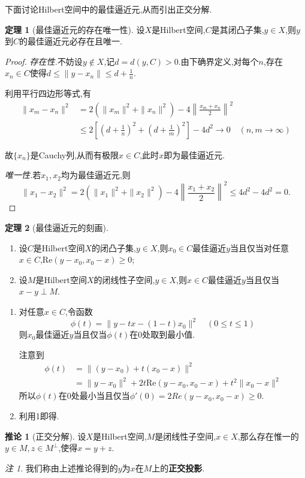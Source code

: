 \documentclass{ctexart}
\theoremstyle{definition}
\newtheorem{theorem}{定理}
\newtheorem{corollary}{推论}
\theoremstyle{remark}
\newtheorem*{remark}{注}
\newenvironment{proofsketch}{
  \renewcommand{\proofname}{证明概要}\proof}{\endproof}
\begin{document}
	下面讨论Hilbert空间中的最佳逼近元,从而引出正交分解.
	\begin{theorem}[最佳逼近元的存在唯一性]
		设$X$是Hilbert空间,$C$是其闭凸子集,$y\in X$,则$y$到$C$的最佳逼近元必存在且唯一.
	\end{theorem}
	\begin{proof}
		\textit{存在性.}不妨设$y\notin X$,记$d=d(y,C)>0$.由下确界定义,对每个$n$,存在$x_n\in C$使得$d\le\|y-x_n\|\le d+\frac{1}{n}$.
		
		利用平行四边形等式,有
		\begin{align*}
			\|x_m-x_n\|^2 & = 2(\|x_m\|^2+\|x_n\|^2)-4\left\|\frac{x_m+x_n}{2}\right\|^2 \\
			& \le 2\left[\left(d+\frac{1}{n}\right)^2+\left(d+\frac{1}{m}\right)^2\right]-4d^2\to 0\quad(n,m\to\infty)
		\end{align*}
		
		故$\{x_n\}$是Cauchy列,从而有极限$x\in C$,此时$x$即为最佳逼近元.
		
		\textit{唯一性.}若$x_1,x_2$均为最佳逼近元,则
		$$\|x_1-x_2\|^2=2(\|x_1\|^2+\|x_2\|^2)-4\left\|\frac{x_1+x_2}{2}\right\|^2\le 4d^2-4d^2=0.$$
	\end{proof}
	\begin{theorem}[最佳逼近元的刻画]
		\hspace*{\fill}
		\begin{enumerate}
			\item 设$C$是Hilbert空间$X$的闭凸子集,$y\in X$,则$x_0\in C$最佳逼近$y$当且仅当对任意$x\in C$,$\mathrm{Re}(y-x_0,x_0-x)\ge 0$;
			\item 设$M$是Hilbert空间$X$的闭线性子空间,$y\in X$,则$x\in C$最佳逼近$y$当且仅当$x-y\perp M$.
		\end{enumerate}
	\end{theorem}
	\begin{proofsketch}
		\begin{enumerate}
			\item 对任意$x\in C$,令函数
			$$\phi(t)=\|y-tx-(1-t)x_0\|^2\quad(0\le t\le 1)$$
			则$x_0$最佳逼近$y$当且仅当$\phi(t)$在$0$处取到最小值.
			
			注意到
			\begin{align*}
				\phi(t) & = \|(y-x_0)+t(x_0-x)\|^2 \\
				& = \|y-x_0\|^2+2t\mathrm{Re}(y-x_0,x_0-x)+t^2\|x_0-x\|^2
			\end{align*}
			所以$\phi(t)$在$0$处最小当且仅当$\phi'(0)=2Re(y-x_0,x_0-x)\ge 0$.
			
			\item 利用1即得.
		\end{enumerate}
	\end{proofsketch}
	\begin{corollary}[正交分解]
		设$X$是Hilbert空间,$M$是闭线性子空间,$x\in X$,那么存在惟一的$y\in M,z\in M^\perp$,使得$x=y+z$.
	\end{corollary}
	\begin{remark}
		我们称由上述推论得到的$y$为$x$在$M$上的\textbf{正交投影}.
	\end{remark}
	
\end{document}
